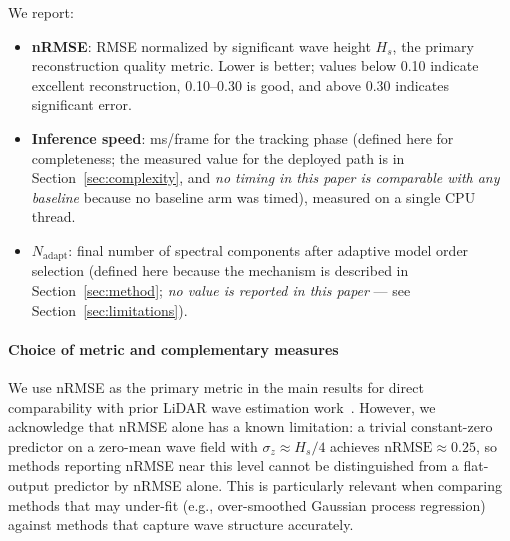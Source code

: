 \documentclass[review]{elsarticle}
\begin{document}
We report:
\begin{itemize}
  \item \textbf{nRMSE}: RMSE normalized by significant wave height $H_s$,
    the primary reconstruction quality metric.
    Lower is better; values below 0.10 indicate excellent reconstruction,
    0.10--0.30 is good, and above 0.30 indicates significant error.
  \item \textbf{Inference speed}: ms/frame for the tracking phase (defined here for
    completeness; the measured value for the deployed path is in
    Section~\ref{sec:complexity}, and \emph{no timing in this paper is comparable
    with any baseline} because no baseline arm was timed),
    measured on a single CPU thread.
  \item \textbf{$N_{\text{adapt}}$}: final number of spectral components
    after adaptive model order selection (defined here because the mechanism is
    described in Section~\ref{sec:method}; \emph{no value is reported in this
    paper} --- see Section~\ref{sec:limitations}).
\end{itemize}

\paragraph{Choice of metric and complementary measures}
We use nRMSE as the primary metric in the main results for direct
comparability with prior LiDAR wave estimation
work~\citep{desmars2020, desmars2023jfm}.
However, we acknowledge that nRMSE alone has a known limitation:
a trivial constant-zero predictor on a zero-mean wave field with
$\sigma_z \approx H_s/4$ achieves $\text{nRMSE} \approx 0.25$,
so methods reporting nRMSE near this level cannot be distinguished
from a flat-output predictor by nRMSE alone.
This is particularly relevant when comparing methods that may
under-fit (e.g., over-smoothed Gaussian process regression) against
methods that capture wave structure accurately.
\end{document}
